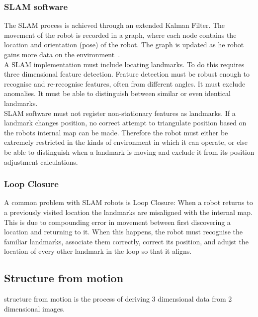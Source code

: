 \documentclass[a4paper, 12pt, titlepage]{article}
\begin{document}
		\subsubsection{SLAM software}
		The SLAM process is achieved through an extended Kalman Filter. The movement of the robot is recorded in a graph, where each node contains the location and orientation (pose) of the robot. The graph is updated as he robot gains more data on the environment~\cite{grisetti2010tutorial}.
		\\A SLAM implementation must include locating landmarks. To do this requires three dimensional feature detection. Feature detection must be robust enough to recognise and re-recognise features, often from different angles. It must exclude anomalies. It must be able to distinguish between similar or even identical landmarks. 
		\\SLAM  software must not register non-stationary features as landmarks. If a landmark changes position, no correct attempt to triangulate position based on the robots internal map can be made. Therefore the robot must either be extremely restricted in the kinds of environment in which it can operate, or else be able to distinguish when a landmark is moving and exclude it from its position adjustment calculations.
		\subsubsection{Loop Closure}
		A common problem with SLAM robots is Loop Closure: When a robot returns to a previously visited location the landmarks are misaligned with the internal map. This is due to compounding error in movement between first discovering a location and returning to it. When this happens, the robot must recognise the familiar landmarks, associate them correctly, correct its position, and adujst the location of every other landmark in the loop so that it aligns.
		
	\subsection{Structure from motion}
	structure from motion is the process of deriving 3 dimensional data from 2 dimensional images.
\end{document}
